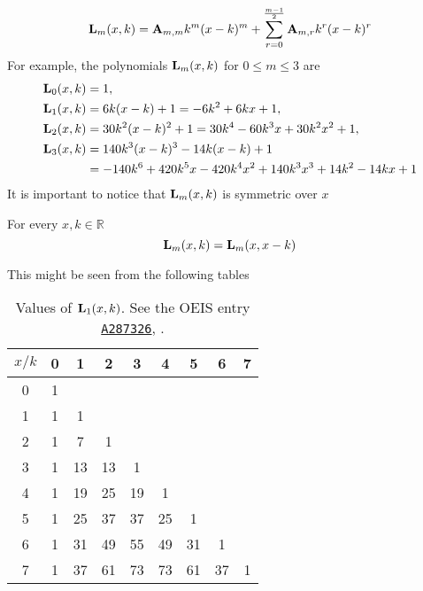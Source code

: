 \begin{equation*}
    {\mathbf{L}}\sb{m}(x,k) = {\mathbf{A}} \sb{m,m} k^m (x-k)^m + \sum_{r=0}^{\frac{m-1}{2}} {\mathbf{A}} \sb{m,r} k^r (x-k)^r
\end{equation*}
For example, the polynomials ${\mathbf{L}}\sb{m}(x,k)$ for $0\leq m\leq 3$ are
\begin{equation*}
    \begin{split}
        {\mathbf{L}}\sb{0}(x,k)
        &= 1, \\
        {\mathbf{L}}\sb{1}(x,k)
        &= 6 k (x-k) + 1
        = -6 k^2 + 6 k x + 1, \\
        {\mathbf{L}}\sb{2}(x,k)
        &=30 k^2 (x-k)^2+1
        =30 k^4-60 k^3 x+30 k^2 x^2+1, \\
        {\mathbf{L}}\sb{3}(x,k)
        &= 140 k^3 (x-k)^3-14 k (x-k)+1 \\
        &=-140 k^6+420 k^5 x-420 k^4 x^2+140 k^3 x^3+14 k^2-14 k x+1
    \end{split}
\end{equation*}
It is important to notice that ${\mathbf{L}}\sb{m}(x,k)$ is symmetric over $x$
\begin{ppty}
    \label{ppty_symmetry_of_polynomial_l}
    For every $x,k\in\mathbb{R}$
    \begin{equation*}
        {\mathbf{L}}\sb{m}(x,k) = {\mathbf{L}}\sb{m}(x,x-k)
    \end{equation*}
\end{ppty}
This might be seen from the following tables
\begin{table}[H]
    \setlength\extrarowheight{-6pt}
    \begin{tabular}{c|cccccccc}
        $x/k$ & 0 & 1  & 2  & 3  & 4  & 5  & 6  & 7 \\
        \hline
        0     & 1 &    &    &    &    &    &    &   \\
        1     & 1 & 1  &    &    &    &    &    &   \\
        2     & 1 & 7  & 1  &    &    &    &    &   \\
        3     & 1 & 13 & 13 & 1  &    &    &    &   \\
        4     & 1 & 19 & 25 & 19 & 1  &    &    &   \\
        5     & 1 & 25 & 37 & 37 & 25 & 1  &    &   \\
        6     & 1 & 31 & 49 & 55 & 49 & 31 & 1  &   \\
        7     & 1 & 37 & 61 & 73 & 73 & 61 & 37 & 1
    \end{tabular}
    ~\caption{Values of ${\mathbf{L}}\sb{1}(x,k)$.
    See the OEIS entry \href{https://oeis.org/A287326}{\texttt{A287326}}, \cite{kolosov2017third}.}
    \label{tab:fig_1}
\end{table}
